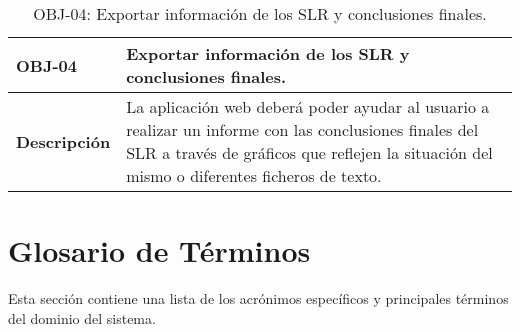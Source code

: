 \begin{table}[!hbt]
	\begin{center}
		\begin{tabular}{|p{2cm}|p{13cm}|}
			\hline
			\textbf{OBJ-04} & Exportar información de los SLR y conclusiones finales.\\
			\hline
			\textbf{Descripción} & La aplicación web deberá poder ayudar al usuario a realizar un informe con las conclusiones finales del SLR a través de gráficos que reflejen la situación del mismo o diferentes ficheros de texto.\\
			\hline
		\end{tabular}
		\caption{OBJ-04: Exportar información de los SLR y conclusiones finales.}
		\label{table:obj04}
	\end{center}
\end{table}

\section{Glosario de Términos} 
Esta sección contiene una lista de los acrónimos específicos y principales términos del dominio del sistema.\\

